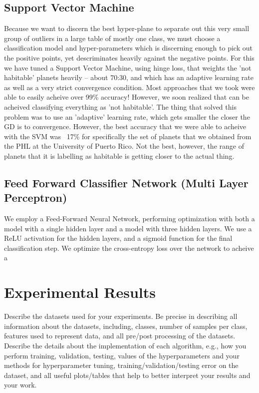 \documentclass[11.5pt]{article}
\begin{document}
\subsection{Support Vector Machine}
Because we want to discern the best hyper-plane to separate out this very small group of outliers in a large table of mostly one class, we must choose a classification model and hyper-parameters which is discerning enough to pick out the positive points, yet descriminates heavily against the negative points. For this we have tuned a Support Vector Machine, using hinge loss, that weights the 'not habitable' planets heavily -- about 70:30, and which has an adaptive learning rate as well as a very strict convergence condition. Most approaches that we took were able to easily acheive over 99\% accuracy! However, we soon realized that can be acheived classifying everything as 'not habitable'. The thing that solved this problem was to use an 'adaptive' learning rate, which gets smaller the closer the GD is to convergence. However, the best accuracy that we were able to acheive with the SVM was ~17\% for specifically the set of planets that we obtained from the PHL at the University of Puerto Rico. Not the best, however, the range of planets that it is labelling as habitable is getting closer to the actual thing.


\subsection{Feed Forward Classifier Network (Multi Layer Perceptron)}
We employ a Feed-Forward Neural Network, performing optimization with both a model with a single hidden layer and a model with three hidden layers. We use a ReLU activation for the hidden layers, and a sigmoid function for the final classification step. We optimize the cross-entropy loss over the network to acheive a 

\section{Experimental Results}
Describe the datasets used for your experiments. Be precise in describing all information about the datasets, including, classes, number of samples per class, features used to represent data, and all pre/post processing of the datasets.\\
Describe the details about the implementation of each algorithm, e.g., how you perform training, validation, testing, values of the hyperparameters and your methods for hyperparameter tuning, training/validation/testing error on the dataset, and all useful plots/tables that help to better interpret your results and your work.
\end{document}
